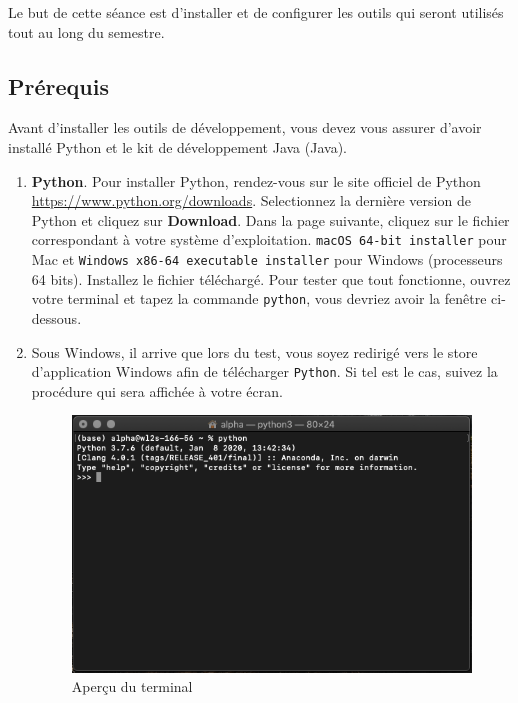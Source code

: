



\ShowSolutiontrue
\ShowConseiltrue
\titre
{}

Le but de cette séance est d'installer et de configurer les outils qui seront utilisés tout au long du semestre. 

\subsection*{Prérequis}
Avant d'installer les outils de développement, vous devez vous assurer d'avoir installé Python et le kit de développement Java (Java).
\begin{enumerate}
    \item \textbf{Python}. Pour installer Python, rendez-vous sur le site officiel de Python \url{https://www.python.org/downloads}. Selectionnez la dernière version de Python et cliquez sur \textbf{Download}. Dans la page suivante, cliquez sur le fichier correspondant à votre système d'exploitation. \lstinline{macOS 64-bit installer} pour Mac et \lstinline{Windows x86-64 executable installer} pour Windows (processeurs 64 bits). Installez le fichier téléchargé. Pour tester que tout fonctionne, ouvrez votre terminal et tapez la commande \lstinline{python}, vous devriez avoir la fenêtre ci-dessous.
    \item 
    Sous Windows, il arrive que lors du test, vous soyez redirigé vers le store d'application Windows afin de télécharger \lstinline{Python}. Si tel est le cas, suivez la procédure qui sera affichée à votre écran.
    
    \begin{figure}[h]
        \centering
        \includegraphics[width=1\textwidth]{img/python.png}
        \caption{Aperçu du terminal}
    \end{figure}


\end{enumerate}
